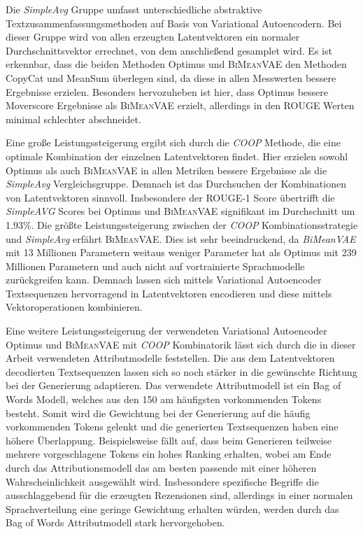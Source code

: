 Die \textit{SimpleAvg} Gruppe umfasst unterschiedliche abstraktive Textzusammenfassungsmethoden auf Basis von Variational Autoencodern.
Bei dieser Gruppe wird von allen erzeugten Latentvektoren ein normaler Durchschnittsvektor errechnet, von dem anschließend gesamplet wird.
Es ist erkennbar, dass die beiden Methoden Optimus und \textsc{BiMeanVAE} den Methoden CopyCat und MeanSum überlegen sind, da diese in allen Messwerten bessere Ergebnisse erzielen.
Besonders hervozuheben ist hier, dass Optimus bessere Moverscore Ergebnisse als \textsc{BiMeanVAE} erzielt, allerdings in den ROUGE Werten minimal schlechter abschneidet. 

Eine große Leistungssteigerung ergibt sich durch die \textit{COOP} Methode, die eine optimale Kombination der einzelnen Latentvektoren findet.
Hier erzielen sowohl Optimus als auch \textsc{BiMeanVAE} in allen Metriken bessere Ergebnisse als die \textit{SimpleAvg} Vergleichsgruppe.
Demnach ist das Durchsuchen der Kombinationen von Latentvektoren sinnvoll. 
Insbesondere der ROUGE-1 Score übertrifft die \textit{SimpleAVG} Scores bei Optimus und \textsc{BiMeanVAE} signifikant im Durchschnitt um 1.93\%.  %
Die größte Leistungssteigerung zwischen der \textit{COOP} Kombinationsstrategie und \textit{SimpleAvg} erfährt \textsc{BiMeanVAE}.
Dies ist sehr beeindruckend, da \textit{BiMeanVAE} mit 13 Millionen Parametern weitaus weniger Parameter hat als Optimus mit 239 Millionen Parametern und auch nicht auf vortrainierte Sprachmodelle zurückgreifen kann.
Demnach lassen sich mittels Variational Autoencoder Textsequenzen hervorragend in Latentvektoren encodieren und diese mittels Vektoroperationen kombinieren.


Eine weitere Leistungssteigerung der verwendeten Variational Autoencoder Optimus und \textsc{BiMeanVAE} mit \textit{COOP} Kombinatorik lässt sich durch die in dieser Arbeit verwendeten Attributmodelle feststellen.
Die aus dem Latentvektoren decodierten Textsequenzen lassen sich so noch stärker in die gewünschte Richtung bei der Generierung adaptieren. 
Das verwendete Attributmodell ist ein Bag of Words Modell, welches aus den 150 am häufigsten vorkommenden Tokens besteht. 
Somit wird die Gewichtung bei der Generierung auf die häufig vorkommenden Tokens gelenkt und die generierten Textsequenzen haben eine höhere Überlappung.
Beispielsweise fällt auf, dass beim Generieren teilweise mehrere vorgeschlagene Tokens ein hohes Ranking erhalten, wobei am Ende durch das Attributionsmodell das am besten passende mit einer höheren Wahrscheinlichkeit ausgewählt wird.
Insbesondere spezifische Begriffe die ausschlaggebend für die erzeugten Rezensionen sind, allerdings in einer normalen Sprachverteilung eine geringe Gewichtung erhalten würden, werden durch das Bag of Words Attributmodell stark hervorgehoben.

